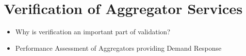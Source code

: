 \chapter{Verification of Aggregator Services} %
\label{cha:verification}

\begin{itemize}
	\item Why is verification an important part of validation?
	\item Performance Assessment of Aggregators providing Demand Response
\end{itemize}


